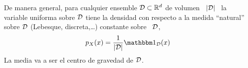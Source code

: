 De manera  general, para  cualquier ensemble $\mathcal{D}  \subset \mathbb{R}^d$ de  volumen \
$|\mathcal{D}|$ \,  la variable uniforma sobre $\mathcal{D}$  tiene la densidad con  respecto a la
medida  ``natural'' sobre  $\mathcal{D}$  (Lebesque, discreta,\ldots)  constante sobre  \
$\mathcal{D}$,
%
\[
p_X(x) = \frac{1}{|\D|} \un_{\D}(x)
\]
%
La media va a ser el centro de gravedad de $\mathcal{D}$.

